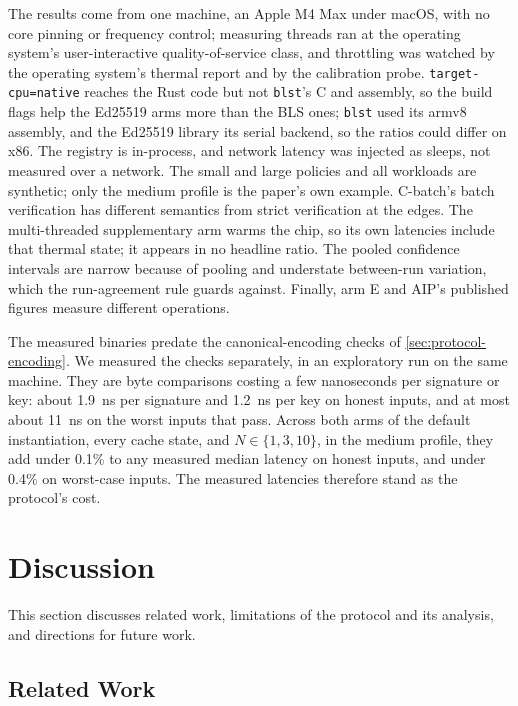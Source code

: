 \documentclass[11pt,a4paper]{article}
\begin{document}
The results come from one machine, an Apple M4 Max under macOS, with no
core pinning or frequency control; measuring threads ran at the
operating system's user-interactive quality-of-service class, and
throttling was
watched by the operating system's thermal report and by the calibration
probe. \texttt{target-cpu=native} reaches the Rust code but not
\texttt{blst}'s C and assembly, so the build flags help the Ed25519 arms
more than the BLS ones; \texttt{blst} used its armv8 assembly, and the
Ed25519 library its serial backend, so the ratios could differ on x86.
The registry is in-process, and network latency was injected as sleeps,
not measured over a network. The small and large policies and all
workloads are synthetic; only the medium profile is the paper's own
example. C-batch's batch verification has different semantics from
strict verification at the edges. The multi-threaded supplementary arm
warms the chip, so its own latencies include that thermal state; it
appears in no headline ratio. The pooled confidence intervals are
narrow because of pooling and understate between-run variation, which
the run-agreement rule guards against. Finally, arm E and AIP's
published figures measure different operations.

The measured binaries predate the canonical-encoding checks of
\cref{sec:protocol-encoding}. We measured the checks separately, in an
exploratory run on the same machine. They are byte comparisons costing
a few nanoseconds per signature or key: about 1.9~ns per signature and
1.2~ns per key on honest inputs, and at most about 11~ns on the worst
inputs that pass. Across both arms of the default instantiation, every
cache state, and $N \in \{1, 3, 10\}$, in the medium profile, they add
under 0.1\% to any measured median latency on honest inputs, and under
0.4\% on worst-case inputs. The measured latencies therefore stand as
the protocol's cost.

\section{Discussion}
\label{sec:discussion}

This section discusses related work, limitations of the protocol and
its analysis, and directions for future work.

\subsection{Related Work}
\label{sec:related-work}
\end{document}
